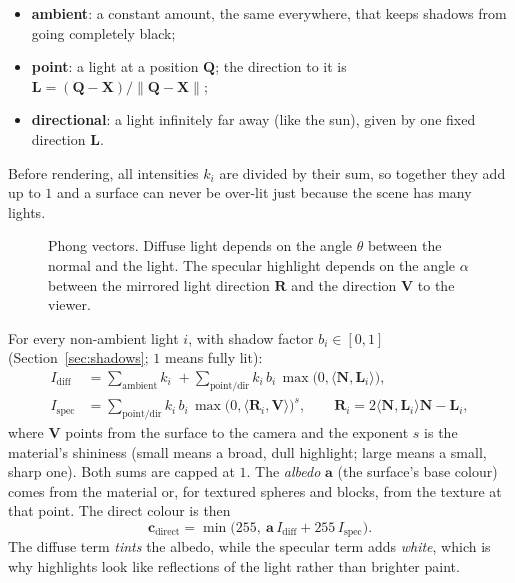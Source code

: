 \documentclass[11pt,a4paper]{article}
\newcommand{\vv}[1]{\mathbf{#1}}
\newcommand{\dotp}[2]{\langle #1, #2\rangle}
\begin{document}
\begin{itemize}[leftmargin=1.4em]
  \item \textbf{ambient}: a constant amount, the same everywhere, that keeps
        shadows from going completely black;
  \item \textbf{point}: a light at a position $\vv Q$; the direction to it is
        $\vv L = (\vv Q-\vv X)/\lVert\vv Q-\vv X\rVert$;
  \item \textbf{directional}: a light infinitely far away (like the sun), given
        by one fixed direction $\vv L$.
\end{itemize}

Before rendering, all intensities $k_i$ are divided by their sum, so together
they add up to $1$ and a surface can never be over-lit just because the scene
has many lights.

\begin{figure}[h]
\centering
{}
\caption{Phong vectors. Diffuse light depends on the angle $\theta$ between the
normal and the light. The specular highlight depends on the angle $\alpha$
between the mirrored light direction $\vv R$ and the direction $\vv V$ to the
viewer.}
\end{figure}

For every non-ambient light $i$, with shadow factor $b_i\in[0,1]$
(Section~\ref{sec:shadows}; $1$ means fully lit):
\begin{align*}
  I_{\text{diff}} &= \sum_{\text{ambient}} k_i \;+ \sum_{\text{point/dir}} k_i\,b_i\,\max\!\big(0,\dotp{\vv N}{\vv L_i}\big),\\
  I_{\text{spec}} &= \sum_{\text{point/dir}} k_i\,b_i\,\max\!\big(0,\dotp{\vv R_i}{\vv V}\big)^{s},
  \qquad \vv R_i = 2\dotp{\vv N}{\vv L_i}\vv N - \vv L_i,
\end{align*}
where $\vv V$ points from the surface to the camera and the exponent $s$ is the
material's shininess (small means a broad, dull highlight; large means a small,
sharp one). Both sums are capped at $1$. The \emph{albedo} $\vv a$ (the surface's
base colour) comes from the material or, for textured spheres and blocks, from
the texture at that point. The direct colour is then
\[
  \vv c_{\text{direct}} = \min\!\big(255,\ \vv a\,I_{\text{diff}} + 255\,I_{\text{spec}}\big).
\]
The diffuse term \emph{tints} the albedo, while the specular term adds
\emph{white}, which is why highlights look like reflections of the light rather
than brighter paint.
\end{document}
